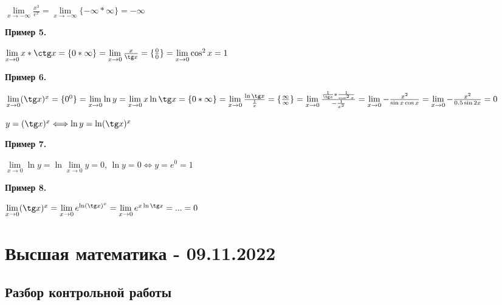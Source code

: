 \documentclass{article}
\begin{document}
\begin{flushleft}
$\lim\limits_{x \to -\infty} \frac{x^3}{e^x} =  \lim\limits_{x \to -\infty} \{ -\infty * \infty \} = -\infty$

\hfill

\textbf{Пример 5.}

$\lim\limits_{x \to 0} x * \ctg x = \{ 0 * \infty \} = \lim\limits_{x \to 0} \frac{x}{\tg x} = \{ \frac{0}{0} \} = \lim\limits_{x \to 0} \cos^2{x} = 1$

\hfill

\textbf{Пример 6.}

$\lim\limits_{x \to 0} (\tg x)^x = \{ 0^0 \} = \lim\limits_{x \to 0} \ln y = \lim\limits_{x \to 0} x \ln \tg x = \{ 0 * \infty \} = \lim\limits_{x \to 0} \frac{\ln \tg x}{\frac{1}{x}} = \{ \frac{\infty}{\infty} \} = \lim\limits_{x \to 0} \frac{\frac{1}{\tg x} * \frac{1}{\cos^2 x}}{-\frac{1}{x^2}} = \lim\limits_{x \to 0} - \frac{x^2}{\sin x \cos x} = \lim\limits_{x \to 0} -\frac{x^2}{0.5\sin 2x} = 0$

$y = (\tg x)^x \Longleftrightarrow \ln y = \ln (\tg x)^x$

\hfill

\textbf{Пример 7.}

$\lim\limits_{x \to 0} \ln y = \ln \lim\limits_{x \to 0} y = 0$,  $\ln y = 0 \Longleftrightarrow y = e^0 = 1$

\hfill

\textbf{Пример 8.}

$\lim\limits_{x \to 0} (\tg x)^x = \lim\limits_{x \to 0} e^{\ln(\tg x)^x} = \lim\limits_{x \to 0} e^{x \ln \tg x} = ... = 0$

\end{flushleft}

\pagebreak
\section{Высшая математика - 09.11.2022}

\subsection{Разбор контрольной работы}
\end{document}
